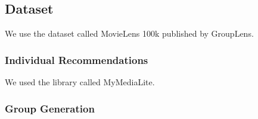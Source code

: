 \subsection{Dataset}\label{sec:dataset}
We use the dataset called MovieLens 100k published by GroupLens\cite{movielens100k}.
\subsubsection{Individual Recommendations}
We used the library called MyMediaLite\citep{mymedialite}.
\subsubsection{Group Generation}
